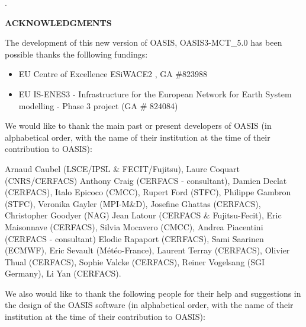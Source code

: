 \newpage
.

\vspace{3cm}

{\bf ACKNOWLEDGMENTS}
 
\vspace{1.5cm}
The development of this new version of OASIS, OASIS3-MCT\_5.0 has been
possible thanks the folllowing fundings:
\begin{itemize}
\item   EU Centre of Excellence ESiWACE2 , GA \#823988
\item EU IS-ENES3 - Infrastructure for the European Network for Earth
System modelling - Phase 3 project (GA \# 824084)
\end{itemize}
\vspace{0.5cm} 

 We would like to thank the main past or present developers of OASIS (in alphabetical order, with the name of their institution at the time of their contribution to OASIS):

Arnaud Caubel (LSCE/IPSL \& FECIT/Fujitsu),
Laure Coquart (CNRS/CERFACS)
Anthony Craig (CERFACS - consultant),
Damien Declat (CERFACS),
Italo Epicoco (CMCC),
Rupert Ford (STFC),
Philippe Gambron (STFC),
Veronika Gayler (MPI-M\&D),
Josefine Ghattas (CERFACS),
Christopher Goodyer (NAG)
Jean Latour (CERFACS \& Fujitsu-Fecit),
Eric Maisonnave (CERFACS),
Silvia Mocavero (CMCC),
Andrea Piacentini (CERFACS -  consultant)
Elodie Rapaport (CERFACS),
Sami Saarinen (ECMWF),
Eric Sevault (M\'et\'eo-France),
Laurent Terray (CERFACS),
Olivier Thual (CERFACS),
Sophie Valcke (CERFACS),
Reiner Vogelsang (SGI Germany),
Li Yan (CERFACS).

\vspace{0.5cm}
We also would like to thank the following people for their help
and suggestions in the design of the OASIS software (in alphabetical
order, with the name of their institution at the time of their contribution to OASIS):

